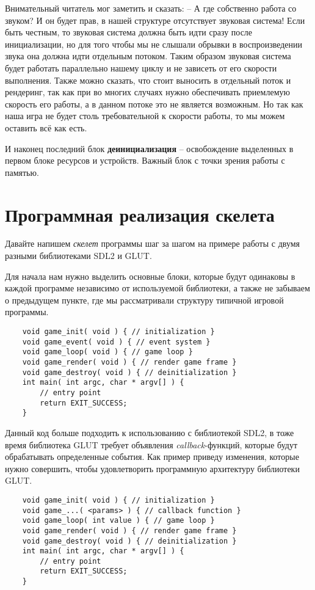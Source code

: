 Внимательный читатель мог заметить и сказать: -- А где собственно работа со звуком? И он будет прав, в нашей 
структуре отсутствует звуковая система! Если быть честным, то звуковая система должна быть идти сразу после 
инициализации, но для того чтобы мы не слышали обрывки в воспроизведении звука она должна идти отдельным 
потоком. Таким образом звуковая система будет работать параллельно нашему циклу и не зависеть от его скорости 
выполнения. Также можно сказать, что стоит выносить в отдельный поток и рендеринг, так как при во многих 
случаях нужно обеспечивать приемлемую скорость его работы, а в данном потоке это не является возможным. 
Но так как наша игра не будет столь требовательной к скорости работы, то мы можем оставить всё как есть.

И наконец последний блок \textbf{деинициализация} -- освобождение выделенных в первом блоке ресурсов и 
устройств. Важный блок с точки зрения работы с памятью.

\section{Программная реализация скелета}
Давайте напишем \emph{скелет} программы шаг за шагом на примере работы с двумя разными библиотеками 
SDL2 и GLUT.

Для начала нам нужно выделить основные блоки, которые будут одинаковы в каждой программе независимо от 
используемой библиотеки, а также не забываем о предыдущем пункте, где мы рассматривали структуру типичной 
игровой программы.

\begin{lstlisting}
    void game_init( void ) { // initialization }
    void game_event( void ) { // event system }
    void game_loop( void ) { // game loop }
    void game_render( void ) { // render game frame }
    void game_destroy( void ) { // deinitialization }
    int main( int argc, char * argv[] ) {
        // entry point
        return EXIT_SUCCESS;
    }
\end{lstlisting}

Данный код больше подходить к использованию с библиотекой SDL2, в тоже время библиотека GLUT требует 
объявления \emph{callback}-функций, которые будут обрабатывать определенные события. Как пример приведу 
изменения, которые нужно совершить, чтобы удовлетворить программную архитектуру библиотеки GLUT.
\begin{lstlisting}
    void game_init( void ) { // initialization }
    void game_...( <params> ) { // callback function }
    void game_loop( int value ) { // game loop }
    void game_render( void ) { // render game frame }
    void game_destroy( void ) { // deinitialization }
    int main( int argc, char * argv[] ) {
        // entry point
        return EXIT_SUCCESS;
    }
\end{lstlisting}

